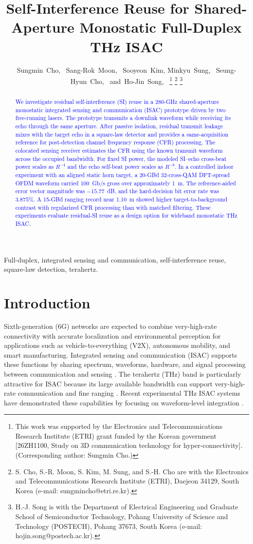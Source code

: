 \documentclass[10pt,journal]{IEEEtran}
\title{Self-Interference Reuse for Shared-Aperture Monostatic Full-Duplex THz ISAC}
\author{Sungmin~Cho,~\IEEEmembership{Member,~IEEE,}
        Sang-Rok~Moon,~\IEEEmembership{Member,~IEEE,}
        Sooyeon~Kim,
        Minkyu~Sung,~\IEEEmembership{Member,~IEEE,}
        Seung-Hyun~Cho,~\IEEEmembership{Member,~IEEE,}
        and~Ho-Jin~Song,~\IEEEmembership{Fellow,~IEEE}%
\thanks{This work was supported by the Electronics and Telecommunications
Research Institute (ETRI) grant funded by the Korean government
[26ZH1100, Study on 3D communication technology for hyper-connectivity].
(Corresponding author: Sungmin Cho.)}%
\thanks{S. Cho, S.-R. Moon, S. Kim, M. Sung, and S.-H. Cho are with the Electronics
and Telecommunications Research Institute (ETRI), Daejeon 34129, South
Korea (e-mail: sungmincho@etri.re.kr).}%
\thanks{H.-J. Song is with the Department of Electrical Engineering and
Graduate School of Semiconductor Technology, Pohang University of Science
and Technology (POSTECH), Pohang 37673, South Korea
(e-mail: hojin.song@postech.ac.kr).}%
}
\DeclareRobustCommand{\rev}[1]{\textcolor{blue}{#1}}
\begin{document}
\maketitle
\begin{abstract}
\rev{We investigate residual self-interference (SI) reuse in a 280-GHz
shared-aperture monostatic integrated sensing and communication (ISAC)
prototype driven by two free-running lasers. The prototype transmits a
downlink waveform while receiving its echo through the same aperture.
After passive isolation, residual
transmit leakage mixes with the target echo in a square-law detector
and provides a same-acquisition reference for post-detection channel
frequency response (CFR) processing. The colocated sensing receiver
estimates the CFR using the known transmit waveform across the
occupied bandwidth. For fixed SI power, the modeled
SI--echo cross-beat power scales as $R^{-4}$ and the echo self-beat
power scales as $R^{-8}$. In a controlled indoor experiment with an
aligned static horn target, a 20-GBd 32-cross-QAM DFT-spread OFDM
waveform carried 100~Gb/s gross over approximately 1~m. The
reference-aided error vector magnitude was $-15.77$~dB, and the
hard-decision bit error rate was $3.875\%$. A 15-GBd ranging record
near 1.10~m showed higher target-to-background contrast with
regularized CFR processing than with matched filtering. These
experiments evaluate residual-SI reuse as a design option for
wideband monostatic THz ISAC.}
\end{abstract}
\begin{IEEEkeywords}
Full-duplex, integrated sensing and communication,
self-interference reuse, square-law detection, terahertz.
\end{IEEEkeywords}

\section{Introduction}

Sixth-generation (6G) networks are expected to combine very-high-rate
connectivity with accurate localization and environmental perception for
applications such as vehicle-to-everything (V2X), autonomous mobility,
and smart manufacturing. Integrated sensing and communication (ISAC)
supports these functions by sharing spectrum, waveforms, hardware, and
signal processing between communication and sensing
\cite{liu_integrated_2022,gonzalez-prelcic_integrated_2024}. The
terahertz (THz) band is particularly attractive for ISAC because its
large available bandwidth can support very-high-rate communication and
fine ranging
\cite{song_terahertz_2022,chaccour_seven_2022,
elbir_Terahertz_2024,zhang_terahertz_2026}. Recent experimental THz ISAC systems have demonstrated these capabilities by focusing on waveform-level integration \cite{jia_unified_2018,lyu_multichannel_2024,shi_310_2026a}.
\end{document}
